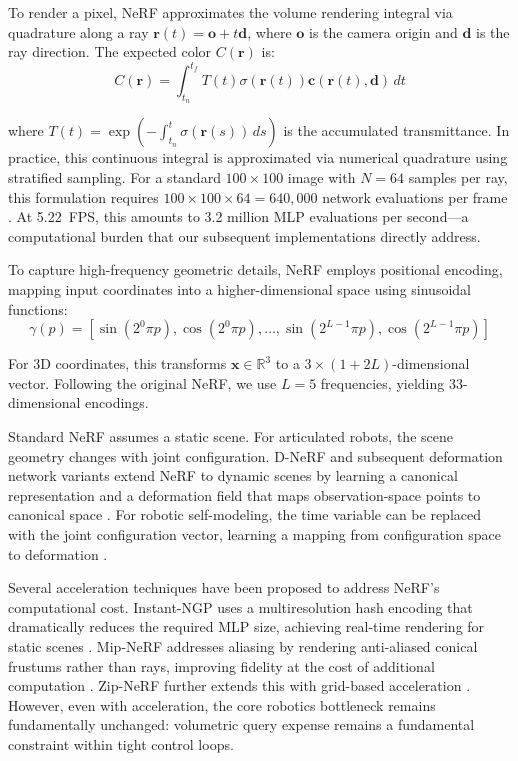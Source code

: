 \documentclass[12pt,a4paper,oneside]{report}
\begin{document}
To render a pixel, NeRF approximates the volume rendering integral via quadrature along a ray $\mathbf{r}(t) = \mathbf{o} + t\mathbf{d}$, where $\mathbf{o}$ is the camera origin and $\mathbf{d}$ is the ray direction. The expected color $C(\mathbf{r})$ is:
\begin{equation}C(\mathbf{r}) = \int_{t_n}^{t_f} T(t) \sigma(\mathbf{r}(t)) \mathbf{c}(\mathbf{r}(t), \mathbf{d}) \, dt
\end{equation}

where $T(t) = \exp\left(-\int_{t_n}^{t} \sigma(\mathbf{r}(s)) \, ds\right)$ is the accumulated transmittance. In practice, this continuous integral is approximated via numerical quadrature using stratified sampling. For a standard $100 \times 100$ image with $N = 64$ samples per ray, this formulation requires $100 \times 100 \times 64 = 640,000$ network evaluations per frame \cite{mildenhall2020nerf}. At 5.22~FPS, this amounts to 3.2 million MLP evaluations per second---a computational burden that our subsequent implementations directly address.

To capture high-frequency geometric details, NeRF employs positional encoding, mapping input coordinates into a higher-dimensional space using sinusoidal functions:
\begin{equation}\gamma(p) = [\sin(2^0 \pi p), \cos(2^0 \pi p), \ldots, \sin(2^{L-1} \pi p), \cos(2^{L-1} \pi p)]
\end{equation}

For 3D coordinates, this transforms $\mathbf{x} \in \mathbb{R}^3$ to a $3 \times (1 + 2L)$-dimensional vector. Following the original NeRF, we use $L = 5$ frequencies, yielding 33-dimensional encodings.

Standard NeRF assumes a static scene. For articulated robots, the scene geometry changes with joint configuration. D-NeRF and subsequent deformation network variants extend NeRF to dynamic scenes by learning a canonical representation and a deformation field that maps observation-space points to canonical space \cite{pumarola2021d, park2021nerfies}. For robotic self-modeling, the time variable can be replaced with the joint configuration vector, learning a mapping from configuration space to deformation \cite{hu2024teaching}.

Several acceleration techniques have been proposed to address NeRF's computational cost. Instant-NGP uses a multiresolution hash encoding that dramatically reduces the required MLP size, achieving real-time rendering for static scenes \cite{muller2022instant}. Mip-NeRF addresses aliasing by rendering anti-aliased conical frustums rather than rays, improving fidelity at the cost of additional computation \cite{barron2021mip}. Zip-NeRF further extends this with grid-based acceleration \cite{barron2023zipnerf}. However, even with acceleration, the core robotics bottleneck remains fundamentally unchanged: volumetric query expense remains a fundamental constraint within tight control loops.
\end{document}
